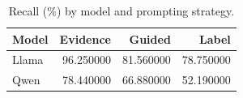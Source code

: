 \begin{table}[t]
\caption{Recall (\%) by model and prompting strategy.}
\label{tab:model_prompt}
\begin{tabular}{lrrr}
\toprule
Model & Evidence & Guided & Label \\
\midrule
Llama & 96.250000 & 81.560000 & 78.750000 \\
Qwen & 78.440000 & 66.880000 & 52.190000 \\
\bottomrule
\end{tabular}
\end{table}
